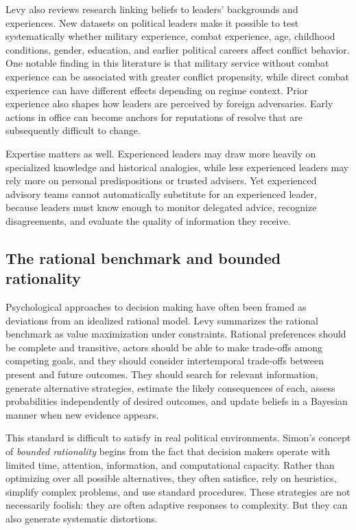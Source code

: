 Levy also reviews research linking beliefs to leaders' backgrounds and experiences. New datasets on political leaders make it possible to test systematically whether military experience, combat experience, age, childhood conditions, gender, education, and earlier political careers affect conflict behavior. One notable finding in this literature is that military service without combat experience can be associated with greater conflict propensity, while direct combat experience can have different effects depending on regime context. Prior experience also shapes how leaders are perceived by foreign adversaries. Early actions in office can become anchors for reputations of resolve that are subsequently difficult to change.

Expertise matters as well. Experienced leaders may draw more heavily on specialized knowledge and historical analogies, while less experienced leaders may rely more on personal predispositions or trusted advisers. Yet experienced advisory teams cannot automatically substitute for an experienced leader, because leaders must know enough to monitor delegated advice, recognize disagreements, and evaluate the quality of information they receive.

\subsection{The rational benchmark and bounded rationality}

Psychological approaches to decision making have often been framed as deviations from an idealized rational model. Levy summarizes the rational benchmark as value maximization under constraints. Rational preferences should be complete and transitive, actors should be able to make trade-offs among competing goals, and they should consider intertemporal trade-offs between present and future outcomes. They should search for relevant information, generate alternative strategies, estimate the likely consequences of each, assess probabilities independently of desired outcomes, and update beliefs in a Bayesian manner when new evidence appears.

This standard is difficult to satisfy in real political environments. Simon's concept of \emph{bounded rationality} begins from the fact that decision makers operate with limited time, attention, information, and computational capacity. Rather than optimizing over all possible alternatives, they often satisfice, rely on heuristics, simplify complex problems, and use standard procedures. These strategies are not necessarily foolish: they are often adaptive responses to complexity. But they can also generate systematic distortions.

